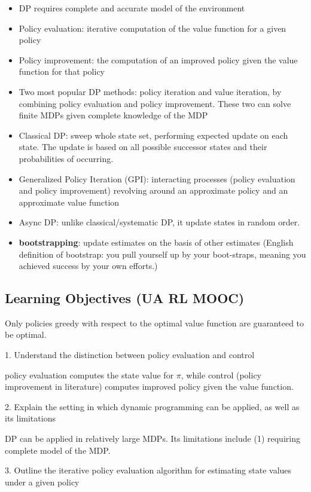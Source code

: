 \documentclass[lang=en,mode=geye,device=normal,color=blue,14pt]{elegantnote}
\DeclareMathOperator*{\1}{\mathbbm{1}}
\begin{document}
\begin{itemize}
\item DP requires complete and accurate model of the environment
\item Policy evaluation: iterative computation of the value function for a given policy
\item Policy improvement: the computation of an improved policy given the value function for that policy
\item Two most popular DP methods: policy iteration and value iteration, by combining policy evaluation and policy improvement. These two can solve finite MDPs given complete knowledge of the MDP
\item Classical DP: sweep whole state set, performing expected update on each state. The update is based on all possible successor states and their probabilities of occurring.
\item Generalized Policy Iteration (GPI): interacting processes (policy evaluation and policy improvement) revolving around an approximate policy and an approximate value function
\item Async DP: unlike classical/systematic DP, it update states in random order.
\item \textbf{bootstrapping}: update estimates on the basis of other estimates (English definition of bootstrap: you pull yourself up by your boot-straps, meaning you achieved success by your own efforts.)
\end{itemize}

\newpage
\subsection{Learning Objectives (UA RL MOOC)}

Only policies greedy with respect to the optimal value function are guaranteed to be optimal.

1. Understand the distinction between policy evaluation and control

policy evaluation computes the state value for $\pi$, while control (policy improvement in literature) computes improved policy given the value function.

2. Explain the setting in which dynamic programming can be applied, as well as its limitations

DP can be applied in relatively large MDPs. Its limitations include (1) requiring complete model of the MDP.

3. Outline the iterative policy evaluation algorithm for estimating state values under a given policy
\end{document}
